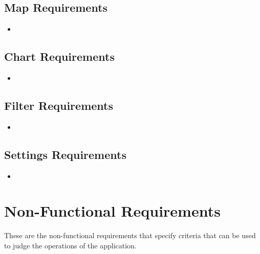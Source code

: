\subsection{Map Requirements}
\begin{itemize}
    \item
\end{itemize}
    
\subsection{Chart Requirements}
\begin{itemize}
    \item
\end{itemize}
    
\subsection{Filter Requirements}
\begin{itemize}
    \item
\end{itemize}
    
\subsection{Settings Requirements}
\begin{itemize}
    \item
\end{itemize}

\section{Non-Functional Requirements}
These are the non-functional requirements that specify criteria that can be used to judge the operations of the application.

